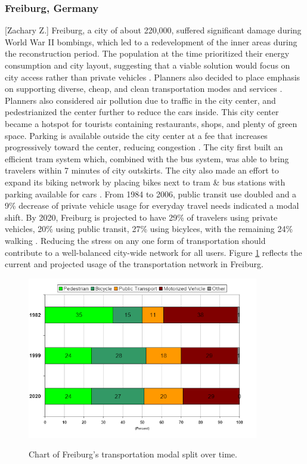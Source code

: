 \documentclass[12pt]{article}                               %
\begin{document}
\subsubsection{Freiburg, Germany}[Zachary Z.]
Freiburg, a city of about 220,000, suffered significant damage during World War II bombings, which led to a redevelopment of the inner areas during the reconstruction period. The population at the time prioritized their energy consumption and city layout, suggesting that a viable solution would focus on city access rather than private vehicles \cite{Rydningen2017}. Planners also decided to place emphasis on supporting diverse, cheap, and clean transportation modes and services \cite{Bindra2006}. Planners also considered air pollution due to traffic in the city center, and pedestrianized the center further to reduce the cars inside. This city center became a hotspot for tourists containing restaurants, shops, and plenty of green space. Parking is available outside the city center at a fee that increases progressively toward the center, reducing congestion \cite{Bindra2006}. The city first built an efficient tram system which, combined with the bus system, was able to bring travelers within 7 minutes of city outskirts. The city also made an effort to expand its biking network by placing bikes next to tram \& bus stations with parking available for cars \cite{Bindra2006}. From 1984 to 2006, public transit use doubled and a 9\% decrease of private vehicle usage for everyday travel needs indicated a modal shift. By 2020, Freiburg is projected to have 29\% of travelers using private vehicles, 20\% using public transit, 27\% using bicylces, with the remaining 24\% walking \cite{Rydningen2017}. Reducing the stress on any one form of transportation should contribute to a well-balanced city-wide network for all users. Figure \ref{img:freiburg_modal_split} reflects the current and projected usage of the transportation network in Freiburg.

\begin{figure}[H]
    \centering
    \includegraphics[width=0.9\textwidth]{images/freiburg_modal_split.png}
    \caption{Chart of Freiburg's transportation modal split over time.}
    \cite{Rydningen2017}
    \label{img:freiburg_modal_split}
\end{figure}
\end{document}
